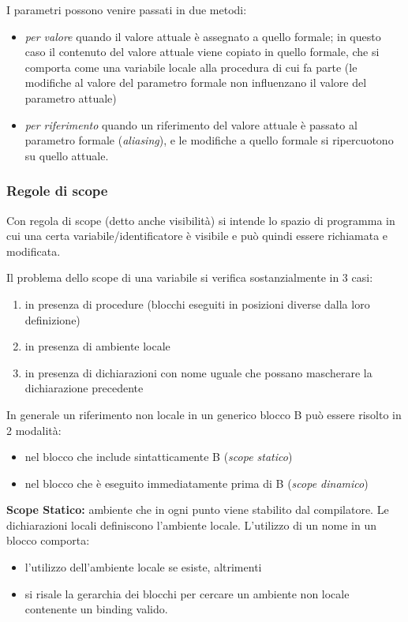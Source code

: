 \documentclass[a4paper, 10pt]{article}
\begin{document}
	I parametri possono venire passati in due metodi:
	\begin{itemize}
		\item \textit{per valore} quando il valore attuale è assegnato a quello formale; in questo caso il contenuto del valore attuale viene copiato in quello formale, che si comporta come una variabile locale alla procedura di cui fa parte (le modifiche al valore del parametro formale non influenzano il valore del parametro attuale)
		
		\item \textit{per riferimento} quando un riferimento del valore attuale è passato al parametro formale (\textit{aliasing}), e le modifiche a quello formale si ripercuotono su quello attuale.
	\end{itemize}
	
	\subsubsection{Regole di scope}
	Con regola di scope (detto anche visibilità) si intende lo spazio di programma in cui una certa variabile/identificatore è visibile e può quindi essere richiamata e modificata.
	
	Il problema dello scope di una variabile si verifica sostanzialmente in 3 casi:
	\begin{enumerate}
		\item in presenza di procedure (blocchi eseguiti in posizioni diverse dalla loro definizione)
		\item in presenza di ambiente locale
		\item in presenza di dichiarazioni con nome uguale che possano mascherare la dichiarazione precedente
	\end{enumerate}
	
	In generale un riferimento non locale in un generico blocco B può essere risolto in 2 modalità:
	\begin{itemize}
		\item nel blocco che include sintatticamente B (\textit{scope statico})
		\item nel blocco che è eseguito immediatamente prima di B (\textit{scope dinamico})
	\end{itemize}
	
	\noindent
	\textbf{Scope Statico: } ambiente che in ogni punto viene stabilito dal compilatore. Le dichiarazioni locali definiscono l'ambiente locale. L'utilizzo di un nome in un blocco comporta:
	\begin{itemize}
		\item l'utilizzo dell'ambiente locale se esiste, altrimenti
		\item si risale la gerarchia dei blocchi per cercare un ambiente non locale contenente un binding valido.
	\end{itemize}
	
\end{document}
